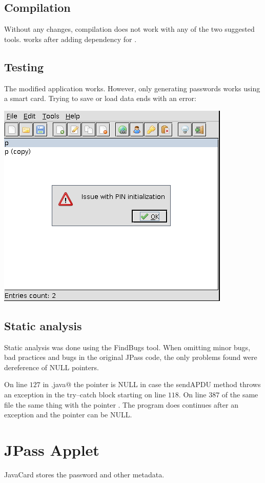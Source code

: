 \documentclass[paper=a4, fontsize=12pt]{scrartcl}
\begin{document}
\subsection{Compilation}
Without any changes, compilation does not work with any of the two suggested tools.
\verb@Maven@ works after adding dependency for \verb@jcardsim@.

\subsection{Testing}
The modified application works.
However, only generating passwords works using a smart card.
Trying to save or load data ends with an error:

\includegraphics[scale=0.5]{jpass_error}

\subsection{Static analysis}
Static analysis was done using the FindBugs tool.
When omitting minor bugs, bad practices and bugs in the original JPass code, the only problems found were dereference of NULL pointers.

On line $127$ in \verb@CardInterface.java@ the pointer \verb@response@ is NULL in case the sendAPDU method throws an exception in the try--catch block starting on line $118$.
On line $387$ of the same file the same thing with the pointer \verb@encrypted@. The program does continues after an exception and the pointer can be NULL.

\section{JPass Applet}
JavaCard stores the password and other metadata.
\end{document}
